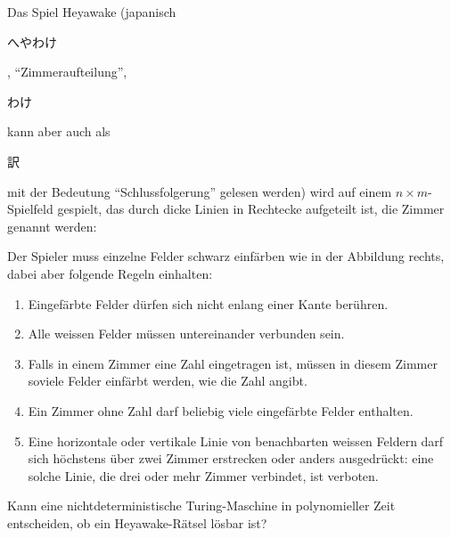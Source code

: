 Das Spiel Heyawake (japanisch \begin{CJK}{UTF8}{min}へやわけ\end{CJK},
``Zimmeraufteilung'', \begin{CJK}{UTF8}{min}わけ\end{CJK} kann aber auch
als \begin{CJK}{UTF8}{min}訳\end{CJK}
mit der Bedeutung ``Schlussfolgerung'' gelesen werden)
wird auf einem $n\times m$-Spielfeld gespielt, das durch dicke Linien in
Rechtecke aufgeteilt ist, die Zimmer genannt werden:
\begin{center}
\def\punkt#1#2{ ({0.8*(#1)},{0.8*(#2)}) }
\def\feld{
	\foreach \i in {1,...,4}{
		\draw \punkt{\i}{0} -- \punkt{\i}{5};
		\draw \punkt{0}{\i} -- \punkt{5}{\i};
	}
	\draw[line width=2.1pt] \punkt{0}{0} rectangle \punkt{1}{3};
	\draw[line width=2.1pt] \punkt{1}{0} rectangle \punkt{2}{3};
	\draw[line width=2.1pt] \punkt{2}{0} rectangle \punkt{4}{4};
	\draw[line width=2.1pt] \punkt{4}{0} rectangle \punkt{5}{4};
	\draw[line width=2.1pt] \punkt{0}{3} rectangle \punkt{2}{5};
	\draw[line width=2.1pt] \punkt{2}{4} rectangle \punkt{4}{5};
	\draw[line width=2.1pt] \punkt{4}{4} rectangle \punkt{5}{5};
	\node at \punkt{0.5}{4.5} {\large $1$};
	\node at \punkt{0.5}{2.5} {\large $2$};
	\node at \punkt{2.5}{3.5} {\large $4$};
}
\def\schwarz#1#2{
	\fill[color=gray!40] \punkt{#1}{#2} rectangle \punkt{#1+1}{#2+1};
}
\end{center}
Der Spieler muss einzelne Felder schwarz einfärben wie in der Abbildung
rechts, dabei aber folgende Regeln einhalten:
\begin{enumerate}
\item
Eingefärbte Felder dürfen sich nicht enlang einer Kante berühren.
\item
Alle weissen Felder müssen untereinander verbunden sein.
\item
Falls in einem Zimmer eine Zahl eingetragen ist, müssen in diesem
Zimmer soviele Felder einfärbt werden, wie die Zahl angibt.
\item
Ein Zimmer ohne Zahl darf beliebig viele eingefärbte Felder enthalten.
\item
Eine horizontale oder vertikale Linie von benachbarten weissen
Feldern darf sich höchstens über zwei Zimmer erstrecken oder
anders ausgedrückt: eine solche Linie, die drei oder mehr Zimmer
verbindet, ist verboten.
\end{enumerate}
Kann eine nichtdeterministische Turing-Maschine in polynomieller
Zeit entscheiden, ob ein Heyawake-Rätsel lösbar ist?

